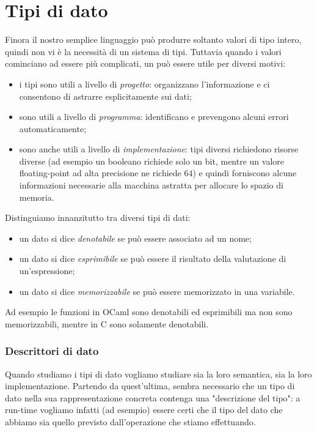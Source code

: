 \section{Tipi di dato}

Finora il nostro semplice linguaggio può produrre soltanto valori di tipo intero, quindi non vi è la necessità di un sistema di tipi. Tuttavia quando i valori cominciano ad essere più complicati, un  può essere utile per diversi motivi:
\begin{itemize}
    \item i tipi sono utili a livello di \emph{progetto}: organizzano l'informazione e ci consentono di astrarre esplicitamente sui dati;
    \item sono utili a livello di \emph{programma}: identificano e prevengono alcuni errori automaticamente;
    \item sono anche utili a livello di \emph{implementazione}: tipi diversi richiedono risorse diverse (ad esempio un booleano richiede solo un bit, mentre un valore floating-point ad alta precisione ne richiede $64$) e quindi forniscono alcune informazioni necessarie alla macchina astratta per allocare lo spazio di memoria.
\end{itemize}

Distinguiamo innanzitutto tra diversi tipi di dati:
\begin{itemize}
    \item un dato si dice \emph{denotabile} se può essere associato ad un nome;
    \item un dato si dice \emph{esprimibile} se può essere il risultato della valutazione di un'espressione;
    \item un dato si dice \emph{memorizzabile} se può essere memorizzato in una variabile.
\end{itemize}

Ad esempio le funzioni in OCaml sono denotabili ed esprimibili ma non sono memorizzabili, mentre in C sono solamente denotabili.

\subsubsection{Descrittori di dato}

Quando studiamo i tipi di dato vogliamo studiare sia la loro semantica, sia la loro implementazione. Partendo da quest'ultima, sembra necessario che un tipo di dato nella sua rappresentazione concreta contenga una "descrizione del tipo": a run-time vogliamo infatti (ad esempio) essere certi che il tipo del dato che abbiamo sia quello previsto dall'operazione che stiamo effettuando.

